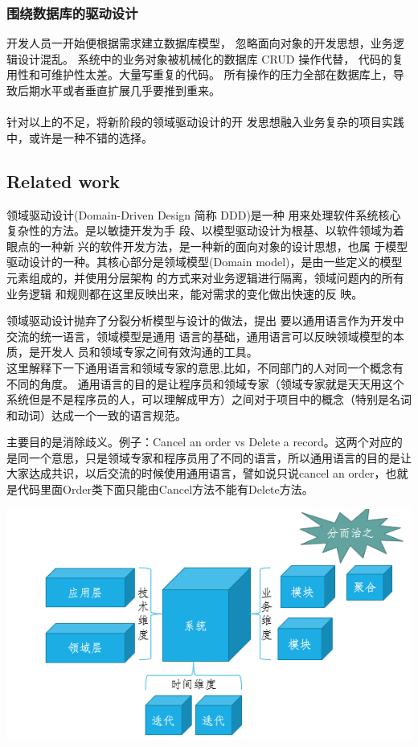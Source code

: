 \documentclass[journal]{IEEEtran}
\begin{document}
\begin{CJK*}{UTF8}{gbsn}
\subsubsection {围绕数据库的驱动设计}
开发人员一开始便根据需求建立数据库模型， 忽略面向对象的开发思想，业务逻辑设计混乱。
系统中的业务对象被机械化的数据库 CRUD 操作代替， 
代码的复用性和可维护性太差。大量写重复的代码。
所有操作的压力全部在数据库上，导致后期水平或者垂直扩展几乎要推到重来。
\\
\\ 针对以上的不足，将新阶段的领域驱动设计的开
发思想融入业务复杂的项目实践中，或许是一种不错的选择。




\subsection{Related work}
  领域驱动设计(Domain-Driven Design 简称 DDD)是一种
用来处理软件系统核心复杂性的方法。是以敏捷开发为手
段、以模型驱动设计为根基、以软件领域为着眼点的一种新
兴的软件开发方法，是一种新的面向对象的设计思想，也属
于模型驱动设计的一种。其核心部分是领域模型(Domain
model)，是由一些定义的模型元素组成的，并使用分层架构
的方式来对业务逻辑进行隔离，领域问题内的所有业务逻辑
和规则都在这里反映出来，能对需求的变化做出快速的反
映。
\newline
 
  领域驱动设计抛弃了分裂分析模型与设计的做法，提出
要以通用语言作为开发中交流的统一语言，领域模型是通用
语言的基础，通用语言可以反映领域模型的本质，是开发人
员和领域专家之间有效沟通的工具。
\\

这里解释下一下通用语言和领域专家的意思,比如，不同部门的人对同一个概念有不同的角度。
通用语言的目的是让程序员和领域专家（领域专家就是天天用这个系统但是不是程序员的人，可以理解成甲方）之间对于项目中的概念（特别是名词和动词）达成一个一致的语言规范。

主要目的是消除歧义。例子：Cancel an order vs Delete a record。这两个对应的是同一个意思，只是领域专家和程序员用了不同的语言，所以通用语言的目的是让大家达成共识，以后交流的时候使用通用语言，譬如说只说cancel an order，也就是代码里面Order类下面只能由Cancel方法不能有Delete方法。

\includegraphics[scale=0.4]{2.png}

\end{CJK*}
\end{document}
